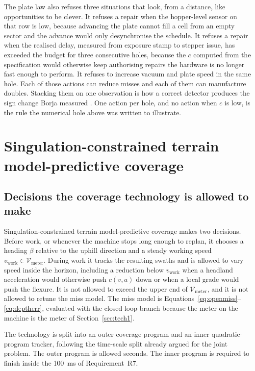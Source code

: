 The plate law also refuses three situations that look, from a distance, like opportunities to be clever. It refuses a repair when the hopper-level sensor on that row is low, because advancing the plate cannot fill a cell from an empty sector and the advance would only desynchronise the schedule. It refuses a repair when the realised delay, measured from exposure stamp to stepper issue, has exceeded the budget for three consecutive holes, because the \(c\) computed from the specification would otherwise keep authorising repairs the hardware is no longer fast enough to perform. It refuses to increase vacuum and plate speed in the same hole. Each of those actions can reduce misses and each of them can manufacture doubles. Stacking them on one observation is how a correct detector produces the sign change Borja measured \cite{borja2021}. One action per hole, and no action when \(c\) is low, is the rule the numerical hole above was written to illustrate.

\section{Singulation-constrained terrain model-predictive coverage}
\label{sec:tech2}

\subsection{Decisions the coverage technology is allowed to make}

Singulation-constrained terrain model-predictive coverage makes two decisions. Before work, or whenever the machine stops long enough to replan, it chooses a heading \(\beta\) relative to the uphill direction and a steady working speed \(v_{\mathrm{work}}\in\mathcal{V}_{\mathrm{meter}}\). During work it tracks the resulting swaths and is allowed to vary speed inside the horizon, including a reduction below \(v_{\mathrm{work}}\) when a headland acceleration would otherwise push \(c(v,a)\) down or when a local grade would push the flexure. It is not allowed to exceed the upper end of \(\mathcal{V}_{\mathrm{meter}}\), and it is not allowed to retune the miss model. The miss model is Equations~\eqref{eq:openmiss}--\eqref{eq:deptherr}, evaluated with the closed-loop branch because the meter on the machine is the meter of Section~\ref{sec:tech1}.

The technology is split into an outer coverage program and an inner quadratic-program tracker, following the time-scale split already argued for the joint problem. The outer program is allowed seconds. The inner program is required to finish inside the \SI{100}{ms} of Requirement~R7.

